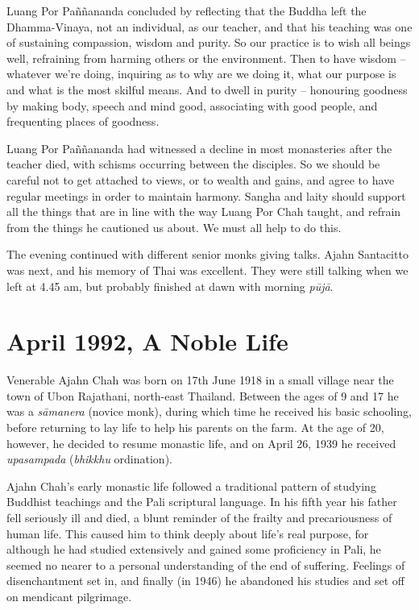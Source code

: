 Luang Por Paññananda concluded by reflecting that the Buddha left the
Dhamma-Vinaya, not an individual, as our teacher, and that his teaching
was one of sustaining compassion, wisdom and purity. So our practice is
to wish all beings well, refraining from harming others or the
environment. Then to have wisdom -- whatever we're doing, inquiring as
to why are we doing it, what our purpose is and what is the most skilful
means. And to dwell in purity -- honouring goodness by making body, 
speech and mind good, associating with good people, and frequenting
places of goodness. 

Luang Por Paññananda had witnessed a decline in most monasteries after
the teacher died, with schisms occurring between the disciples. So we
should be careful not to get attached to views, or to wealth and gains, 
and agree to have regular meetings in order to maintain harmony. Sangha
and laity should support all the things that are in line with the way
Luang Por Chah taught, and refrain from the things he cautioned us
about. We must all help to do this. 

The evening continued with different senior monks giving talks. Ajahn
Santacitto was next, and his memory of Thai was excellent. They were
still talking when we left at 4.45 am, but probably finished at dawn
with morning \emph{pūjā}. 

\chapter{April 1992, A Noble Life}

Venerable Ajahn Chah was born on 17th June 1918 in a small village near
the town of Ubon Rajathani, north-east Thailand. Between the ages of 9
and 17 he was a \emph{sāmanera} (novice monk), during which time he
received his basic schooling, before returning to lay life to help his
parents on the farm. At the age of 20, however, he decided to resume
monastic life, and on April 26, 1939 he received \emph{upasampada}
 (\emph{bhikkhu} ordination). 

Ajahn Chah's early monastic life followed a traditional pattern of
studying Buddhist teachings and the Pali scriptural language. In his
fifth year his father fell seriously ill and died, a blunt reminder of
the frailty and precariousness of human life. This caused him to think
deeply about life's real purpose, for although he had studied
extensively and gained some proficiency in Pali, he seemed no nearer to
a personal understanding of the end of suffering. Feelings of
disenchantment set in, and finally (in 1946) he abandoned his studies
and set off on mendicant pilgrimage. 

